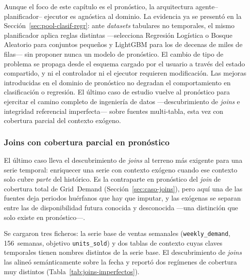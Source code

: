 Aunque el foco de este capítulo es el pronóstico, la arquitectura agente–planificador–
ejecutor es agnóstica al dominio. La evidencia ya se presentó en la
Sección~\ref{sec:pool-clasif-regr}: ante \textit{datasets} tabulares no temporales, el
mismo planificador aplica reglas distintas —selecciona Regresión Logística o Bosque
Aleatorio para conjuntos pequeños y LightGBM para los de decenas de miles de filas— sin
proponer nunca un modelo de pronóstico. El cambio de tipo de problema se propaga desde
el esquema cargado por el usuario a través del estado compartido, y ni el controlador ni
el ejecutor requieren modificación. Las mejoras introducidas en el dominio de pronóstico
no degradan el comportamiento en clasificación o regresión.
El último caso de estudio vuelve al pronóstico para ejercitar el camino completo de
ingeniería de datos —descubrimiento de \textit{joins} e integridad referencial imperfecta—
sobre fuentes multi-tabla, esta vez con cobertura parcial del contexto exógeno.


\subsubsection{Joins con cobertura parcial en pronóstico}
\label{sec:caso-joins-imperfectos}

El último caso lleva el descubrimiento de \textit{joins} al terreno más exigente para una
serie temporal: enriquecer una serie con contexto exógeno cuando ese contexto solo cubre
\emph{parte} del histórico. Es la contraparte en pronóstico del \textit{join} de cobertura
total de Grid~Demand (Sección~\ref{sec:caso-joins}), pero aquí una de las fuentes deja
periodos huérfanos que hay que imputar, y las exógenas se separan entre las de
disponibilidad futura conocida y desconocida —una distinción que solo existe en pronóstico—.

Se cargaron tres ficheros: la serie base de ventas semanales (\texttt{weekly\_demand},
156~semanas, objetivo \texttt{units\_sold}) y dos tablas de contexto cuyas claves temporales
tienen nombres distintos de la serie base. El descubrimiento de \textit{joins} las alineó
semánticamente sobre la fecha y reportó dos regímenes de cobertura muy distintos
(Tabla~\ref{tab:joins-imperfectos}).

